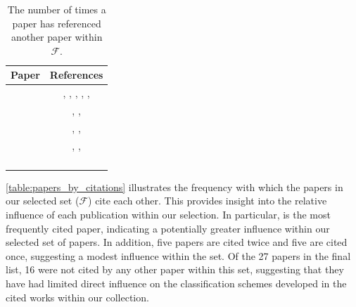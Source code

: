 \begin{table}[t]
\begin{minipage}[t]{0.55\textwidth}
\begin{tabular}{l c}
            \toprule
            \textbf{Paper} & \textbf{References} \\
            \midrule
            \cite{auer_sciqa_2023} & \cite{bordes_large-scale_2015}, \cite{dubey_lc-quad_2019}, \cite{li_learning_2002}, \cite{singhal_att_1999}, \cite{riloff_rule-based_2000}, \cite{mikhailian_learning_2009} \\
            \cite{chernov_linguistically_2015} & \cite{singhal_att_1999}, \cite{moldovan_structure_2000}, \cite{mikhailian_learning_2009}\\
            \cite{karras_divide_2023} & \cite{sjoberg_future_2007}, \cite{auer_sciqa_2023}, \cite{jaradeh_question_2020} \\
            \cite{taffa_hybrid-squad_2024} & \cite{auer_sciqa_2023}, \cite{banerjee_dblp-quad_2023}, \cite{jaradeh_question_2020} \\
            \cite{bolotova_non-factoid_2022} & \cite{li_learning_2002} \\
            \cite{allam_question_2016} & \cite{li_learning_2002} \\
            \cite{banerjee_dblp-quad_2023} & \cite{dubey_lc-quad_2019} \\
            \cite{usbeck_qald-10_2023} & \cite{dubey_lc-quad_2019} \\
            \bottomrule
        \end{tabular}
        \caption[Number of References within Paper Selection]{The number of times a paper has referenced another paper within $\mathcal{F}$.}
        \label{table:papers_by_references}
    \end{minipage}
\end{table}


\autoref{table:papers_by_citations} illustrates the frequency with which the papers in our selected set ($\mathcal{F}$) cite each other. This provides insight into the relative influence of each publication within our selection. In particular, \cite{li_learning_2002} is the most frequently cited paper, indicating a potentially greater influence within our selected set of papers. In addition, five papers are cited twice and five are cited once, suggesting a modest influence within the set. Of the 27 papers in the final list, 16 were not cited by any other paper within this set, suggesting that they have had limited direct influence on the classification schemes developed in the cited works within our collection.


